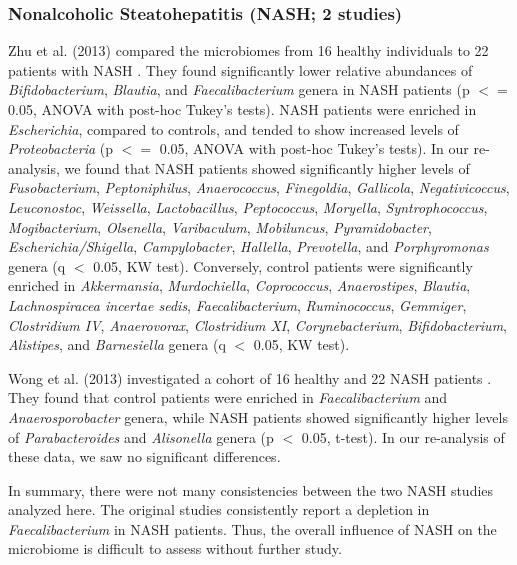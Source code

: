\subsubsection{Nonalcoholic Steatohepatitis (NASH; 2 studies)}

Zhu et al. (2013) compared the microbiomes from 16 healthy individuals to 22 patients with NASH \cite{nash-baker}.
They found significantly lower relative abundances of \textit{Bifidobacterium}, \textit{Blautia}, and \textit{Faecalibacterium} genera in NASH patients (p $<=$ 0.05, ANOVA with post-hoc Tukey's tests).
NASH patients were enriched in \textit{Escherichia}, compared to controls, and tended to show increased levels of \textit{Proteobacteria} (p $<=$ 0.05, ANOVA with post-hoc Tukey's tests).
In our re-analysis, we found that NASH patients showed significantly higher levels of \textit{Fusobacterium}, \textit{Peptoniphilus}, \textit{Anaerococcus}, \textit{Finegoldia}, \textit{Gallicola}, \textit{Negativicoccus}, \textit{Leuconostoc}, \textit{Weissella}, \textit{Lactobacillus}, \textit{Peptococcus}, \textit{Moryella}, \textit{Syntrophococcus}, \textit{Mogibacterium}, \textit{Olsenella}, \textit{Varibaculum}, \textit{Mobiluncus}, \textit{Pyramidobacter}, \textit{Escherichia/Shigella}, \textit{Campylobacter}, \textit{Hallella}, \textit{Prevotella}, and \textit{Porphyromonas} genera (q $<$ 0.05, KW test).
Conversely, control patients were significantly enriched in \textit{Akkermansia}, \textit{Murdochiella}, \textit{Coprococcus}, \textit{Anaerostipes}, \textit{Blautia}, \textit{Lachnospiracea incertae sedis}, \textit{Faecalibacterium}, \textit{Ruminococcus}, \textit{Gemmiger}, \textit{Clostridium IV}, \textit{Anaerovorax}, \textit{Clostridium XI}, \textit{Corynebacterium}, \textit{Bifidobacterium}, \textit{Alistipes}, and \textit{Barnesiella} genera (q $<$ 0.05, KW test).

Wong et al. (2013) investigated a cohort of 16 healthy and 22 NASH patients \cite{nash-chan}.
They found that control patients were enriched in \textit{Faecalibacterium} and \textit{Anaerosporobacter} genera, while NASH patients showed significantly higher levels of \textit{Parabacteroides} and \textit{Alisonella} genera (p $<$ 0.05, t-test).
In our re-analysis of these data, we saw no significant differences.

In summary, there were not many consistencies between the two NASH studies analyzed here.
The original studies consistently report a depletion in \textit{Faecalibacterium} in NASH patients.
Thus, the overall influence of NASH on the microbiome is difficult to assess without further study.

